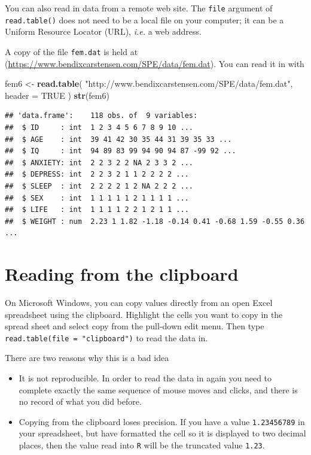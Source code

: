\documentclass[
]{book}
\newenvironment{Shaded}{\begin{snugshade}}{\end{snugshade}}
\newcommand{\AttributeTok}[1]{\textcolor[rgb]{0.13,0.29,0.53}{#1}}
\newcommand{\ConstantTok}[1]{\textcolor[rgb]{0.56,0.35,0.01}{#1}}
\newcommand{\FunctionTok}[1]{\textcolor[rgb]{0.13,0.29,0.53}{\textbf{#1}}}
\newcommand{\NormalTok}[1]{#1}
\newcommand{\OtherTok}[1]{\textcolor[rgb]{0.56,0.35,0.01}{#1}}
\newcommand{\StringTok}[1]{\textcolor[rgb]{0.31,0.60,0.02}{#1}}
\providecommand{\tightlist}{%
  \setlength{\itemsep}{0pt}\setlength{\parskip}{0pt}}
\begin{document}
You can also read in data from a remote web site. The \texttt{file}
argument of \texttt{read.table()} does not need to be a local file on
your computer; it can be a Uniform Resource Locator (URL), \emph{i.e.}
a web address.

A copy of the file \texttt{fem.dat} is held at
(\url{https://www.bendixcarstensen.com/SPE/data/fem.dat}). You can
read it in with

\begin{Shaded}
\begin{Highlighting}[]
\NormalTok{fem6 }\OtherTok{\textless{}{-}} 
  \FunctionTok{read.table}\NormalTok{(}
    \StringTok{"http://www.bendixcarstensen.com/SPE/data/fem.dat"}\NormalTok{,}
    \AttributeTok{header =} \ConstantTok{TRUE}
\NormalTok{  )}
\FunctionTok{str}\NormalTok{(fem6)}
\end{Highlighting}
\end{Shaded}

\begin{verbatim}
## 'data.frame':    118 obs. of  9 variables:
##  $ ID     : int  1 2 3 4 5 6 7 8 9 10 ...
##  $ AGE    : int  39 41 42 30 35 44 31 39 35 33 ...
##  $ IQ     : int  94 89 83 99 94 90 94 87 -99 92 ...
##  $ ANXIETY: int  2 2 3 2 2 NA 2 3 3 2 ...
##  $ DEPRESS: int  2 2 3 2 1 1 2 2 2 2 ...
##  $ SLEEP  : int  2 2 2 2 1 2 NA 2 2 2 ...
##  $ SEX    : int  1 1 1 1 1 2 1 1 1 1 ...
##  $ LIFE   : int  1 1 1 1 2 2 1 2 1 1 ...
##  $ WEIGHT : num  2.23 1 1.82 -1.18 -0.14 0.41 -0.68 1.59 -0.55 0.36 ...
\end{verbatim}

\section{Reading from the clipboard}\label{reading-from-the-clipboard}

On Microsoft Windows, you can copy values directly from an open Excel
spreadsheet using the clipboard. Highlight the cells you want to copy
in the spread sheet and select copy from the pull-down edit menu. Then
type \texttt{read.table(file\ =\ "clipboard")} to read the data in.

There are two reasons why this is a bad idea

\begin{itemize}
\tightlist
\item
  It is not reproducible. In order to read the data in again you
  need to complete exactly the same sequence of mouse moves and clicks,
  and there is no record of what you did before.
\item
  Copying from the clipboard loses precision. If you have a value
  \texttt{1.23456789} in your spreadsheet, but have formatted the cell so it
  is displayed to two decimal places, then the value read into
  \texttt{R} will be the truncated value \texttt{1.23}.
\end{itemize}
\end{document}

